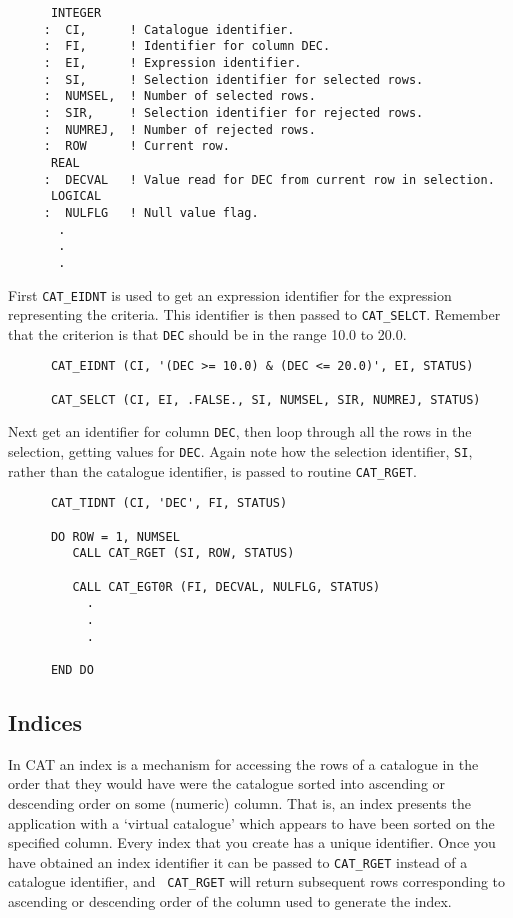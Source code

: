 \begin{verbatim}
      INTEGER
     :  CI,      ! Catalogue identifier.
     :  FI,      ! Identifier for column DEC.
     :  EI,      ! Expression identifier.
     :  SI,      ! Selection identifier for selected rows.
     :  NUMSEL,  ! Number of selected rows.
     :  SIR,     ! Selection identifier for rejected rows.
     :  NUMREJ,  ! Number of rejected rows.
     :  ROW      ! Current row.
      REAL
     :  DECVAL   ! Value read for DEC from current row in selection.
      LOGICAL
     :  NULFLG   ! Null value flag.
       .
       .
       .
\end{verbatim}

First {\tt CAT\_EIDNT} is used to get an expression identifier for the 
expression representing the criteria.  This identifier is then passed 
to {\tt CAT\_SELCT}. Remember that the criterion is that {\tt DEC} 
should be in the range 10.0 to 20.0.

\begin{verbatim}
      CAT_EIDNT (CI, '(DEC >= 10.0) & (DEC <= 20.0)', EI, STATUS)

      CAT_SELCT (CI, EI, .FALSE., SI, NUMSEL, SIR, NUMREJ, STATUS)
\end{verbatim}

Next get an identifier for column {\tt DEC}, then loop through all the 
rows in the selection, getting values for {\tt DEC}.  Again note how the
selection identifier, {\tt SI}, rather than the catalogue identifier, 
is passed to routine {\tt CAT\_RGET}.

\begin{verbatim}
      CAT_TIDNT (CI, 'DEC', FI, STATUS)

      DO ROW = 1, NUMSEL
         CALL CAT_RGET (SI, ROW, STATUS)

         CALL CAT_EGT0R (FI, DECVAL, NULFLG, STATUS)
           .
           .
           .

      END DO
\end{verbatim}


\subsection{Indices}

In CAT an index is a mechanism for accessing the rows of a catalogue in
the order that they would have were the catalogue sorted into ascending
or descending order on some (numeric) column. That is, an index presents
the application with a `virtual catalogue' which appears to have been
sorted on the specified column. Every index that you create has a unique 
identifier. Once you have obtained an index identifier it can be passed to
{\tt CAT\_RGET} instead of a catalogue identifier, and {\tt
CAT\_RGET} will return subsequent rows corresponding to ascending or
descending order of the column used to generate the index.

